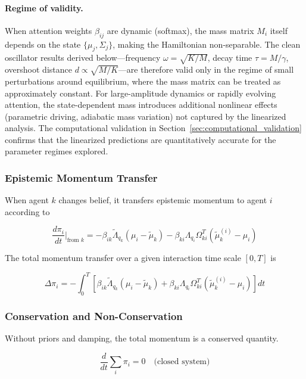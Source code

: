 \documentclass[12pt]{article}
\begin{document}
\paragraph{Regime of validity.} When attention weights $\beta_{ij}$ are dynamic (softmax), the mass matrix $M_i$ itself depends on the state $\{\mu_j, \Sigma_j\}$, making the Hamiltonian non-separable. The clean oscillator results derived below---frequency $\omega = \sqrt{K/M}$, decay time $\tau = M/\gamma$, overshoot distance $d \propto \sqrt{M/K}$---are therefore valid only in the regime of small perturbations around equilibrium, where the mass matrix can be treated as approximately constant. For large-amplitude dynamics or rapidly evolving attention, the state-dependent mass introduces additional nonlinear effects (parametric driving, adiabatic mass variation) not captured by the linearized analysis. The computational validation in Section~\ref{sec:computational_validation} confirms that the linearized predictions are quantitatively accurate for the parameter regimes explored.


\subsubsection{Epistemic Momentum Transfer}


When agent $k$ changes belief, it transfers epistemic momentum to agent $i$ according to

\begin{equation}
\frac{d\pi_i}{dt}\bigg|_{\text{from } k} = -\beta_{ik}\tilde{\Lambda}_{q_k}(\mu_i - \tilde{\mu}_k) - \beta_{ki}\Lambda_{q_i}\Omega_{ki}^T(\tilde{\mu}_k^{(i)} - \mu_i)
\end{equation}

The total momentum transfer over a given interaction time scale $[0, T]$ is

\begin{equation}
\boxed{\Delta\pi_i = -\int_0^T \left[\beta_{ik}\tilde{\Lambda}_{q_k}(\mu_i - \tilde{\mu}_k) + \beta_{ki}\Lambda_{q_i}\Omega_{ki}^T(\tilde{\mu}_k^{(i)} - \mu_i)\right] dt}
\end{equation}


\subsubsection{Conservation and Non-Conservation}

Without priors and damping, the total momentum is a conserved quantity.

\begin{equation}
\frac{d}{dt}\sum_i \pi_i = 0 \quad \text{(closed system)}
\end{equation}
\end{document}
